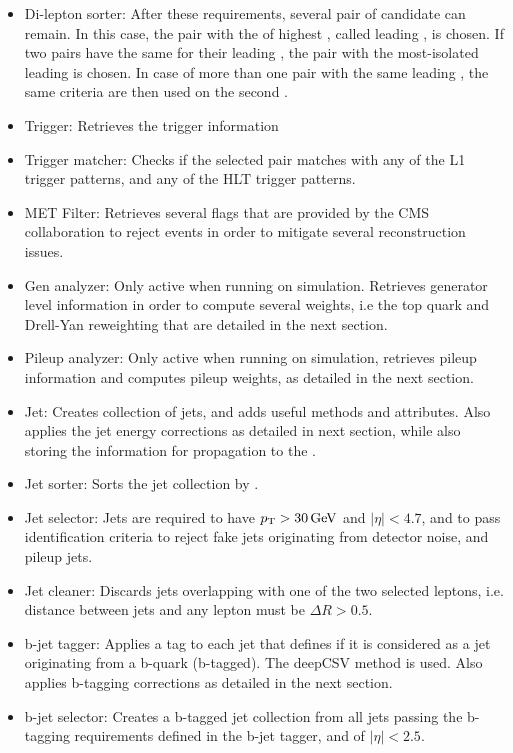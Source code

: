 \begin{itemize}
    \item Di-lepton sorter: After these requirements, several pair of \tauh candidate can remain. In this case, the pair with the \tauh of highest \pt, called leading \tauh, is chosen. If two pairs have the same \pt for their leading \tauh, the pair with the most-isolated leading \tauh is chosen. In case of more than one pair with the same leading \tauh, the same criteria are then used on the second \tauh.
    \item Trigger: Retrieves the trigger information
    \item Trigger matcher: Checks if the selected \tauh pair matches with any of the L1 trigger patterns, and any of the HLT trigger patterns.
    \item MET Filter: Retrieves several flags that are provided by the CMS collaboration to reject events in order to mitigate several \MET reconstruction issues.
    \item Gen analyzer: Only active when running on simulation. Retrieves generator level information in order to compute several weights, i.e the top quark and Drell-Yan \pt reweighting that are detailed in the next section.
    \item Pileup analyzer: Only active when running on simulation, retrieves pileup information and computes pileup weights, as detailed in the next section.
    \item Jet: Creates collection of jets, and adds useful methods and attributes. Also applies the jet energy corrections as detailed in next section, while also storing the information for propagation to the \MET.
    \item Jet sorter: Sorts the jet collection by \pt.
    \item Jet selector: Jets are required to have $p_{\mathrm{T}} > 30\,\mathrm{GeV}$ and $|\eta| < 4.7$, and to pass identification criteria to reject fake jets originating from detector noise, and pileup jets.
    \item Jet cleaner: Discards jets overlapping with one of the two selected leptons, i.e. distance between jets and any lepton must be $\Delta R > 0.5$.
    \item b-jet tagger: Applies a tag to each jet that defines if it is considered as a jet originating from a b-quark (b-tagged). The deepCSV method \cite{Sirunyan_2018} is used. Also applies b-tagging corrections as detailed in the next section.
    \item b-jet selector: Creates a b-tagged jet collection from all jets passing the b-tagging requirements defined in the b-jet tagger, and of $|\eta|<2.5$.

\end{itemize}
